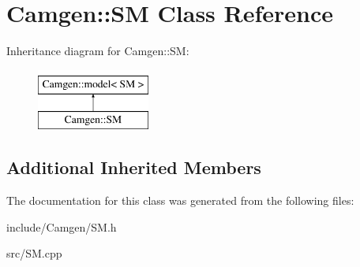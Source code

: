 \hypertarget{a00511}{}\section{Camgen\+:\+:S\+M Class Reference}
\label{a00511}
Inheritance diagram for Camgen\+:\+:S\+M\+:\begin{figure}[H]
\begin{center}
\leavevmode
\includegraphics[height=2.000000cm]{a00511}
\end{center}
\end{figure}
\subsection*{Additional Inherited Members}


The documentation for this class was generated from the following files\+:\begin{DoxyCompactItemize}
\item 
include/\+Camgen/S\+M.\+h\item 
src/S\+M.\+cpp\end{DoxyCompactItemize}
